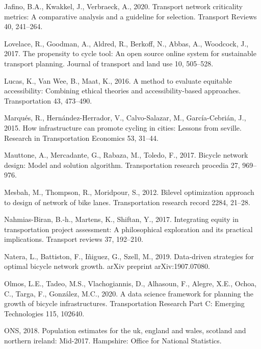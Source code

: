 \documentclass[]{elsarticle} %
\begin{document}
\leavevmode\hypertarget{ref-jafino2020transport}{}%
Jafino, B.A., Kwakkel, J., Verbraeck, A., 2020. Transport network
criticality metrics: A comparative analysis and a guideline for
selection. Transport Reviews 40, 241--264.

\leavevmode\hypertarget{ref-lovelace2017propensity}{}%
Lovelace, R., Goodman, A., Aldred, R., Berkoff, N., Abbas, A., Woodcock,
J., 2017. The propensity to cycle tool: An open source online system for
sustainable transport planning. Journal of transport and land use 10,
505--528.

\leavevmode\hypertarget{ref-lucas2016method}{}%
Lucas, K., Van Wee, B., Maat, K., 2016. A method to evaluate equitable
accessibility: Combining ethical theories and accessibility-based
approaches. Transportation 43, 473--490.

\leavevmode\hypertarget{ref-marques2015infrastructure}{}%
Marqués, R., Hernández-Herrador, V., Calvo-Salazar, M., García-Cebrián,
J., 2015. How infrastructure can promote cycling in cities: Lessons from
seville. Research in Transportation Economics 53, 31--44.

\leavevmode\hypertarget{ref-mauttone2017bicycle}{}%
Mauttone, A., Mercadante, G., Rabaza, M., Toledo, F., 2017. Bicycle
network design: Model and solution algorithm. Transportation research
procedia 27, 969--976.

\leavevmode\hypertarget{ref-mesbah2012bilevel}{}%
Mesbah, M., Thompson, R., Moridpour, S., 2012. Bilevel optimization
approach to design of network of bike lanes. Transportation research
record 2284, 21--28.

\leavevmode\hypertarget{ref-nahmias2017integrating}{}%
Nahmias-Biran, B.-h., Martens, K., Shiftan, Y., 2017. Integrating equity
in transportation project assessment: A philosophical exploration and
its practical implications. Transport reviews 37, 192--210.

\leavevmode\hypertarget{ref-natera2019data}{}%
Natera, L., Battiston, F., Iñiguez, G., Szell, M., 2019. Data-driven
strategies for optimal bicycle network growth. arXiv preprint
arXiv:1907.07080.

\leavevmode\hypertarget{ref-olmos2020data}{}%
Olmos, L.E., Tadeo, M.S., Vlachogiannis, D., Alhasoun, F., Alegre, X.E.,
Ochoa, C., Targa, F., González, M.C., 2020. A data science framework for
planning the growth of bicycle infrastructures. Transportation Research
Part C: Emerging Technologies 115, 102640.

\leavevmode\hypertarget{ref-ofn2018population}{}%
ONS, 2018. Population estimates for the uk, england and wales, scotland
and northern ireland: Mid-2017. Hampshire: Office for National
Statistics.
\end{document}

